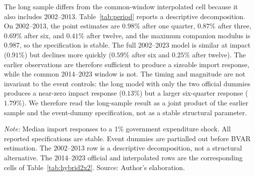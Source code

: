 \documentclass[11pt,a4paper]{article}
\begin{document}
The long sample differs from the common-window interpolated cell because it also includes 2002--2013. Table~\ref{tab:period} reports a descriptive decomposition. On 2002--2013, the point estimates are $0.98\%$ after one quarter, $0.87\%$ after three, $0.69\%$ after six, and $0.41\%$ after twelve, and the maximum companion modulus is 0.987, so the specification is stable. The full 2002--2023 model is similar at impact ($0.91\%$) but declines more quickly ($0.59\%$ after six and $0.25\%$ after twelve). The earlier observations are therefore sufficient to produce a sizeable import response, while the common 2014--2023 window is not. The timing and magnitude are not invariant to the event controls: the long model with only the two official dummies produces a near-zero impact response ($0.13\%$) but a larger six-quarter response ($1.79\%$). We therefore read the long-sample result as a joint product of the earlier sample and the event-dummy specification, not as a stable structural parameter.

\begin{table}[htbp]
\centering
\small
\caption{Period decomposition of the import response, order 1 (percent)}
\label{tab:period}
\par\vspace{0.3em}
\begin{minipage}{0.95\textwidth}
\footnotesize\textit{Note:} Median import responses to a 1\% government expenditure shock. All reported specifications are stable. Event dummies are partialled out before BVAR estimation. The 2002--2013 row is a descriptive decomposition, not a structural alternative. The 2014--2023 official and interpolated rows are the corresponding cells of Table~\ref{tab:hybrid2x2}. Source: Author's elaboration.
\end{minipage}
\end{table}
\end{document}
